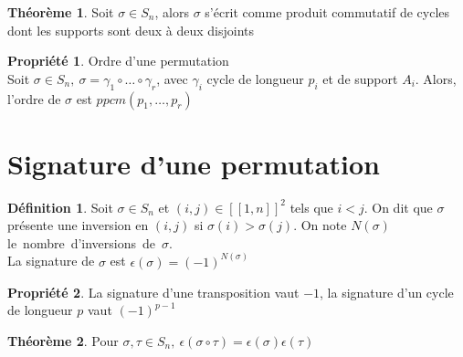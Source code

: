 \documentclass[fleqn]{article}
\theoremstyle{definition} \newtheorem*{defi}{D\'efinition}
\theoremstyle{definition} \newtheorem*{theo}{Th\'eor\`eme}
\theoremstyle{definition} \newtheorem*{coro}{Corollaire}
\theoremstyle{definition} \newtheorem*{nota}{Notation}
\theoremstyle{definition} \newtheorem*{vocab}{Vocabulaire}
\theoremstyle{remark} \newtheorem*{rqs}{Remarques}
\theoremstyle{definition} \newtheorem*{prop}{Propri\'et\'e}
\begin{document}
\begin{theo}
	Soit $\sigma \in S_n$, alors $\sigma$ s'\'ecrit comme produit commutatif de cycles dont les supports sont deux \`a deux disjoints
\end{theo}

\begin{prop} Ordre d'une permutation\\
	Soit $\sigma \in S_n,\ \sigma = \gamma_1 \circ \hdots \circ \gamma_r$, avec $\gamma_i$ cycle de longueur $p_i$ et de support $A_i$. Alors,
	l'ordre de $\sigma$ est $ppcm(p_1, \hdots, p_r)$
\end{prop}

\section{Signature d'une permutation}
\begin{defi}
	Soit $\sigma \in S_n$ et $(i,j) \in [\![1,n]\!]^2$ tels que $i < j$. On dit que $\sigma$ pr\'esente une inversion en $(i,j)$ si $\sigma(i)
	> \sigma(j)$. On note $N(\sigma)$ \mbox{le nombre d'inversions de $\sigma$.}\\
	La signature de $\sigma$ est $\epsilon(\sigma) = (-1)^{N(\sigma)}$
\end{defi}

\begin{prop}
	La signature d'une transposition vaut $-1$, la signature d'un cycle de longueur $p$ vaut $(-1)^{p-1}$
\end{prop}

\begin{theo}
	Pour $\sigma, \tau \in S_n,\ \epsilon(\sigma \circ \tau) = \epsilon(\sigma) \epsilon(\tau)$
\end{theo}
\end{document}
